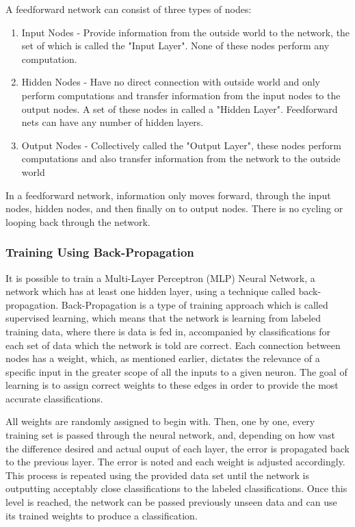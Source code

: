 A feedforward network can consist of three types of nodes:
\begin{enumerate}
    \item Input Nodes - Provide information from the outside world to the network, the set of which is called the "Input Layer". None of these nodes perform any computation.
    \item Hidden Nodes - Have no direct connection with outside world and only perform computations and transfer information from the input nodes to the output nodes. A set of these nodes in called a "Hidden Layer". Feedforward nets can have any number of hidden layers.
    \item Output Nodes - Collectively called the "Output Layer", these nodes perform computations and also transfer information from the network to the outside world
\end{enumerate}

In a feedforward network, information only moves forward, through the input nodes, hidden nodes, and then finally on to output nodes. There is no cycling or looping back through the network.
\subsubsection{Training Using Back-Propagation}
It is possible to train a Multi-Layer Perceptron (MLP) Neural Network, a network which has at least one hidden layer, using a technique called back-propagation. Back-Propagation is a type of training approach which is called supervised learning, which means that the network is learning from labeled training data, where there is data is fed in, accompanied by classifications for each set of data which the network is told are correct. Each connection between nodes has a weight, which, as mentioned earlier, dictates the relevance of a specific input in the greater scope of all the inputs to a given neuron. The goal of learning is to assign correct weights to these edges in order to provide the most accurate classifications.

All weights are randomly assigned to begin with. Then, one by one, every training set is passed through the neural network, and, depending on how vast the difference desired and actual ouput of each layer, the error is propagated back to the previous layer. The error is noted and each weight is adjusted accordingly. This process is repeated using the provided data set until the network is outputting acceptably close classifications to the labeled classifications. Once this level is reached, the network can be passed previously unseen data and can use its trained weights to produce a classification. 